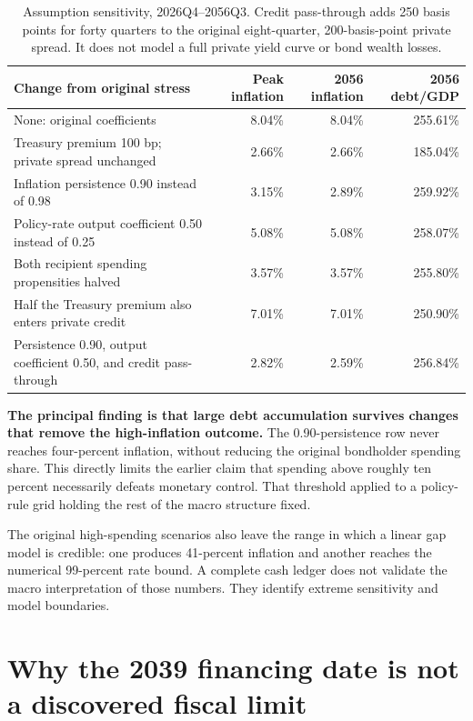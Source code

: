 \documentclass[11pt]{article}
\begin{document}
\begin{table}[htbp]
\centering
\small
\setlength{\tabcolsep}{4pt}
\begin{tabularx}{\textwidth}{Yrrr}
\toprule
Change from original stress & Peak inflation & 2056 inflation & 2056 debt/GDP\\
\midrule
None: original coefficients & 8.04\% & 8.04\% & 255.61\%\\
Treasury premium 100 bp; private spread unchanged & 2.66\% & 2.66\% & 185.04\%\\
Inflation persistence 0.90 instead of 0.98 & 3.15\% & 2.89\% & 259.92\%\\
Policy-rate output coefficient 0.50 instead of 0.25 & 5.08\% & 5.08\% & 258.07\%\\
Both recipient spending propensities halved & 3.57\% & 3.57\% & 255.80\%\\
Half the Treasury premium also enters private credit & 7.01\% & 7.01\% & 250.90\%\\
Persistence 0.90, output coefficient 0.50, and credit pass-through &
2.82\% & 2.59\% & 256.84\%\\
\bottomrule
\end{tabularx}
\caption{Assumption sensitivity, 2026Q4--2056Q3. Credit pass-through adds 250 basis points
for forty quarters to the original eight-quarter, 200-basis-point private spread. It does
not model a full private yield curve or bond wealth losses.}
\label{tab:review}
\end{table}

\textbf{The principal finding is that large debt accumulation survives changes that remove
the high-inflation outcome.} The 0.90-persistence row never reaches four-percent inflation,
without reducing the original bondholder spending share. This directly limits the earlier
claim that spending above roughly ten percent necessarily defeats monetary control. That
threshold applied to a policy-rule grid holding the rest of the macro structure fixed.

The original high-spending scenarios also leave the range in which a linear gap model is
credible: one produces 41-percent inflation and another reaches the numerical 99-percent
rate bound. A complete cash ledger does not validate the macro interpretation of those
numbers. They identify extreme sensitivity and model boundaries.

\section{Why the 2039 financing date is not a discovered fiscal limit}
\end{document}
